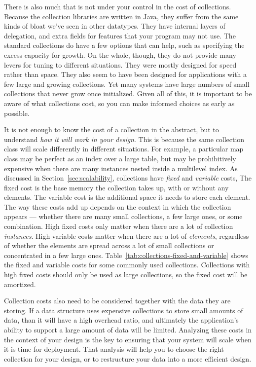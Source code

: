There is also much that is not under your control in the cost
of collections.
Because the collection libraries are written in Java, they suffer
from the same kinds of bloat we've seen in other datatypes. They have
internal layers of delegation, and extra fields for features that your program may not use. The standard
collections do have a few options that can help, such as
specifying the excess capacity for growth. On the whole, though, they do not
provide many levers for tuning to different situations. They were mostly
designed for speed rather than space. They also seem to have been designed for
applications with a few large and growing collections. Yet many systems have large numbers
of small collections that never grow once initialized. Given all of this, it is important
to be aware of what collections cost, so you can make informed choices as early as possible. 

It is not enough to know the cost of a collection in the abstract, but to
understand \emph{how it will work in your design}. This is because the same
collection class will scale differently in
different situations. For example, a particular map class may be perfect as
an index over a large table, but may be prohibitively expensive
when there are many instances nested inside a multilevel index. 
As discussed in Section~\ref{sec:scalability}, collections have \emph{fixed} and
\emph{variable} costs,  The fixed cost is the base memory the collection takes
up, with or without any elements. The variable cost is the additional space it
needs to store each element. The way these costs add up
depends on the context in which the collection appears ---
whether there are many small collections, a few large ones, or some
combination. High fixed costs only matter when
there are a lot of collection \emph{instances}. High variable costs matter when
there are a lot of \emph{elements}, regardless of whether the elements are
spread across a lot of small collections
or concentrated in a few large ones.
Table~\ref{tab:collections-fixed-and-variable} shows the fixed and variable costs for some commonly used collections.  %
Collections with high fixed costs should only be used as large collections, so
the fixed cost will be amortized. 

Collection costs also need to be
considered together with the data they are storing. If a data structure uses expensive collections
to store small amounts of data, than it
will have a high overhead ratio, and ultimately the application's ability to
support a large amount of data will be limited. Analyzing
these costs in the context of your design is the key to ensuring that your system will scale when
it is time for deployment. That analysis will help you to choose the right
collection for your design, or to restructure your data into a more efficient
design.


